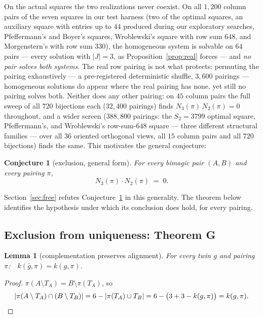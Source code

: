 \documentclass[11pt]{article}
\newtheorem{lemma}[theorem]{Lemma}
\newtheorem{conjecture}[theorem]{Conjecture}
\begin{document}
On the actual squares the two realizations never coexist. On all
$1{,}200$ column pairs of the seven squares in our test harness (two
of the optimal squares, an auxiliary square with entries up to $44$
produced during our exploratory searches, Pfeffermann's and Boyer's
squares, Wroblewski's square with row sum $648$, and Morgenstern's
with row sum $330$), the
homogeneous system is solvable on $64$ pairs --- every solution with
$|J|=3$, as Proposition~\ref{prop:real} forces --- and \emph{no pair
solves both systems}. The real row pairing is not what protects:
permuting the pairing exhaustively --- a pre-registered deterministic
shuffle, $3{,}600$ pairings --- homogeneous solutions do appear where
the real pairing has none, yet still no pairing solves both. Neither
does any other pairing: on $45$ column pairs the full sweep of all
$720$ bijections each ($32{,}400$ pairings) finds $N_3(\pi)\,
N_2(\pi)=0$ throughout, and a wider screen ($388{,}800$ pairings:
the $S_2=3799$ optimal square, Pfeffermann's, and Wroblewski's
row-sum-$648$ square --- three different structural families --- over
all $36$ oriented orthogonal views, all $15$ column pairs and all
$720$ bijections) finds the same. This motivates the general conjecture:

\begin{conjecture}[exclusion, general form]\label{conj:excl}
For every bimagic pair $(A,B)$ and every pairing $\pi$,
\[
N_3(\pi)\cdot N_2(\pi)\;=\;0 .
\]
\end{conjecture}

Section~\ref{sec:free} refutes Conjecture~\ref{conj:excl} in this
generality. The theorem below identifies the hypothesis under which
its conclusion does hold, for every pairing.

\subsection{Exclusion from uniqueness: Theorem G}

\begin{lemma}[complementation preserves alignment]\label{lem:compl}
For every twin $g$ and pairing $\pi$:\ \ $k(\bar g,\pi)=k(g,\pi)$.
\end{lemma}

\begin{proof}
$\pi(A\setminus T_A)=B\setminus\pi(T_A)$, so
\[
|\pi(A\setminus T_A)\cap(B\setminus T_B)|
=6-|\pi(T_A)\cup T_B|
=6-\bigl(3+3-k(g,\pi)\bigr)=k(g,\pi). \qedhere
\]
\end{proof}
\end{document}
